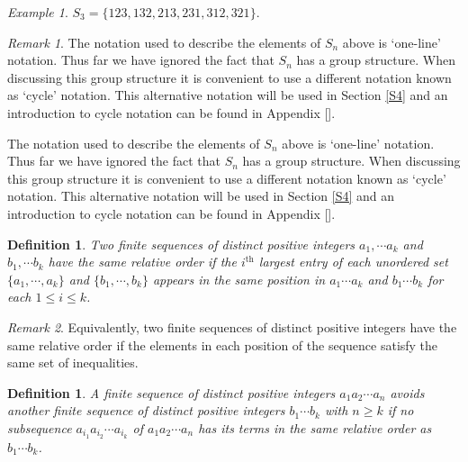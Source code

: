 \documentclass[11pt,letterpaper,twoside,english]{article}
\theoremstyle{theorem}
\newtheorem{definition}[theorem]{Definition}
\theoremstyle{remark}
\newtheorem{remark}{Remark}
\newtheorem{example}{Example}
\begin{document}
\begin{example}
$S_3=\{123,132,213,231,312,321\}$. 
\end{example}


\begin{remark}
The notation used to describe the elements of $S_n$ above is `one-line' notation. Thus far we have ignored the fact that $S_n$ has a group structure. When discussing this group structure it is convenient to use a different notation known as `cycle' notation. This alternative notation will be used in Section \ref{S4} and an introduction to cycle notation can be found in Appendix []. 

The notation used to describe the elements of $S_n$ above is `one-line' notation. Thus far we have ignored the fact that $S_n$ has a group structure. When discussing this group structure it is convenient to use a different notation known as `cycle' notation. This alternative notation will be used in Section \ref{S4} and an introduction to cycle notation can be found in Appendix []. 
\end{remark}

\begin{definition}
Two finite sequences of distinct positive integers $a_1,\cdots a_k$ and $b_1,\cdots b_k$ have the same relative order if the $i^\text{th}$ largest entry of each unordered set $\{a_1,\cdots,a_k\}$ and $\{b_1,\cdots, b_k\}$ appears in the same position in $a_1\cdots a_k$ and $b_1\cdots b_k$ for each $1\le i\le k$. 
\end{definition}

\begin{remark}
Equivalently, two finite sequences of distinct positive integers have the same relative order if the elements in each position of the sequence satisfy the same set of inequalities.
\end{remark}

\begin{definition}
A finite sequence of distinct positive integers $a_1a_2\cdots a_n$ avoids another finite sequence of distinct positive integers $b_1\cdots b_k$ with $n\ge k$ if no subsequence $a_{i_1}a_{i_2}\cdots a_{i_k}$ of $a_1a_2\cdots a_n$ has its terms in the same relative order as $b_1\cdots b_k$. 
\end{definition}
\end{document}
